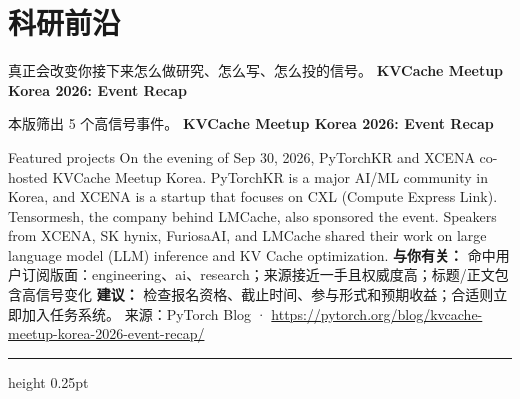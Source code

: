 \documentclass[10.5pt]{ctexart}
\begin{document}
\section*{科研前沿}
{\color{ormuted} 真正会改变你接下来怎么做研究、怎么写、怎么投的信号。}
\vspace{2mm}
{\LARGE\bfseries KVCache Meetup Korea 2026: Event Recap}\par
\vspace{1mm}
{\color{ormuted} 本版筛出 5 个高信号事件。}
\vspace{3mm}
{\Large\bfseries KVCache Meetup Korea 2026: Event Recap}\par
Featured projects On the evening of Sep 30, 2026, PyTorchKR and XCENA co-hosted KVCache Meetup Korea. PyTorchKR is a major AI/ML community in Korea, and XCENA is a startup that focuses on CXL (Compute Express Link). Tensormesh, the company behind LMCache, also sponsored the event. Speakers from XCENA, SK hynix, FuriosaAI, and LMCache shared their work on large language model (LLM) inference and KV Cache optimization.
\textbf{与你有关：} 命中用户订阅版面：engineering、ai、research；来源接近一手且权威度高；标题/正文包含高信号变化
\textbf{建议：} 检查报名资格、截止时间、参与形式和预期收益；合适则立即加入任务系统。
{\footnotesize\color{ormuted} 来源：PyTorch Blog · \url{https://pytorch.org/blog/kvcache-meetup-korea-2026-event-recap/}}
\vspace{4mm}
\hrule height 0.25pt
\vspace{3mm}
\end{document}
